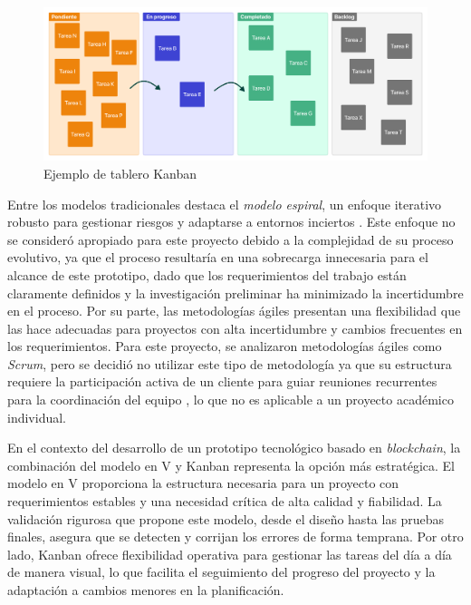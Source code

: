 \begin{figure}[!tb]
    \centering
    \includegraphics[width=\textwidth]{Figures/model-kanban.png}
    \caption[Tablero Kanban]{Ejemplo de tablero Kanban}
    \label{fig:kanban-board}
\end{figure}

Entre los modelos tradicionales destaca el \textit{modelo espiral}, un enfoque iterativo robusto para gestionar riesgos y adaptarse a entornos inciertos \cite{pressman2010ingenieria}. Este enfoque no se consideró apropiado para este proyecto debido a la complejidad de su proceso evolutivo, ya que el proceso resultaría en una sobrecarga innecesaria para el alcance de este prototipo, dado que los requerimientos del trabajo están claramente definidos y la investigación preliminar ha minimizado la incertidumbre en el proceso. Por su parte, las metodologías ágiles presentan una flexibilidad que las hace adecuadas para proyectos con alta incertidumbre y cambios frecuentes en los requerimientos. Para este proyecto, se analizaron metodologías ágiles como \textit{Scrum}, pero se decidió no utilizar este tipo de metodología ya que su estructura requiere la participación activa de un cliente para guiar reuniones recurrentes para la coordinación del equipo \cite{pressman2010ingenieria}, lo que no es aplicable a un proyecto académico individual. 

En el contexto del desarrollo de un prototipo tecnológico basado en \textit{blockchain}, la combinación del modelo en V y Kanban representa la opción más estratégica. El modelo en V proporciona la estructura necesaria para un proyecto con requerimientos estables y una necesidad crítica de alta calidad y fiabilidad. La validación rigurosa que propone este modelo, desde el diseño hasta las pruebas finales, asegura que se detecten y corrijan los errores de forma temprana. Por otro lado, Kanban ofrece flexibilidad operativa para gestionar las tareas del día a día de manera visual, lo que facilita el seguimiento del progreso del proyecto y la adaptación a cambios menores en la planificación.

